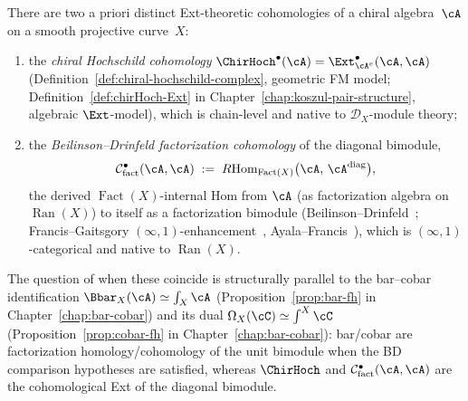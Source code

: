 
There are two a priori distinct Ext-theoretic cohomologies of a
chiral algebra~$\cA$ on a smooth projective
curve~$X$:
\begin{enumerate}[label=\textup{(\roman*)}]
\item the \emph{chiral Hochschild cohomology}
$\ChirHoch^\bullet(\cA) =
\Ext^\bullet_{\cA^e}(\cA,\cA)$
\textup{(}Definition~\textup{\ref{def:chiral-hochschild-complex}},
geometric FM model;
Definition~\textup{\ref{def:chirHoch-Ext}} in
Chapter~\textup{\ref{chap:koszul-pair-structure}},
algebraic $\Ext$-model\textup{)},
which is chain-level and native to
$\mathcal{D}_X$-module theory;
\item the \emph{Beilinson--Drinfeld factorization cohomology}
of the diagonal bimodule,
\[
\mathcal{C}^\bullet_{\mathrm{fact}}(\cA,\cA)
\;:=\;
R\mathrm{Hom}_{\operatorname{Fact}(X)}
\bigl(\cA,\, \cA^{\mathrm{diag}}\bigr),
\]
the derived $\operatorname{Fact}(X)$-internal Hom from $\cA$ (as
factorization algebra on $\operatorname{Ran}(X)$) to itself as
a factorization bimodule
\textup{(}Beilinson--Drinfeld~\textup{\cite[\S3.4]{BD04}};
Francis--Gaitsgory
$(\infty,1)$-enhancement~\textup{\cite[\S5.5.2]{HA}},
Ayala--Francis~\textup{\cite[\S3-\S4]{AF15}}\textup{)}, which
is $(\infty,1)$-categorical and native to $\operatorname{Ran}(X)$.
\end{enumerate}
The question of when these coincide is structurally parallel to
the bar--cobar identification
$\Bbar_X(\cA) \simeq \int_X\cA$
\textup{(}Proposition~\textup{\ref{prop:bar-fh}} in
Chapter~\textup{\ref{chap:bar-cobar}}\textup{)} and its dual
$\Omega_X(\cC) \simeq \int^X\cC$
\textup{(}Proposition~\textup{\ref{prop:cobar-fh}} in
Chapter~\textup{\ref{chap:bar-cobar}}\textup{)}: bar/cobar are
factorization homology/cohomology of the unit bimodule when the
BD comparison hypotheses are satisfied, whereas
$\ChirHoch$ and $\mathcal{C}^\bullet_{\mathrm{fact}}(\cA,\cA)$
are the cohomological Ext of the diagonal bimodule.

